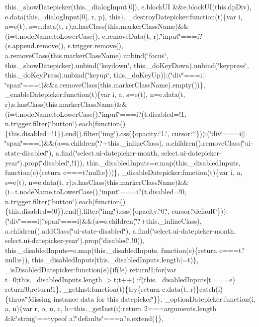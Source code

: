 {{\begin{DoxyParamCaption}
this.\+\_\+show\+Datepicker(this.\+\_\+dialog\+Input\mbox{[}0\mbox{]}), e.\+block\+U\+I \&\&e.\+block\+U\+I(this.\+dp\+Div), e.\+data(this.\+\_\+dialog\+Input\mbox{[}0\mbox{]}, r, p), this\}, \+\_\+destroy\+Datepicker\+:function(t)\{var i, a=e(t), s=e.\+data(t, r);a.\+has\+Class(this.\+marker\+Class\+Name)\&\&(i=t.\+node\+Name.\+to\+Lower\+Case(), e.\+remove\+Data(t, r),\char`\"{}input\char`\"{}===i?(s.\+append.\+remove(), s.\+trigger.\+remove(), a.\+remove\+Class(this.\+marker\+Class\+Name).\+unbind(\char`\"{}focus\char`\"{}, this.\+\_\+show\+Datepicker).\+unbind(\char`\"{}keydown\char`\"{}, this.\+\_\+do\+Key\+Down).\+unbind(\char`\"{}keypress\char`\"{}, this.\+\_\+do\+Key\+Press).\+unbind(\char`\"{}keyup\char`\"{}, this.\+\_\+do\+Key\+Up))\+:(\char`\"{}div\char`\"{}===i$\vert$$\vert$\char`\"{}span\char`\"{}===i)\&\&a.\+remove\+Class(this.\+marker\+Class\+Name).\+empty())\}, \+\_\+enable\+Datepicker\+:function(t)\{var i, a, s=e(t), n=e.\+data(t, r);s.\+has\+Class(this.\+marker\+Class\+Name)\&\&(i=t.\+node\+Name.\+to\+Lower\+Case(),\char`\"{}input\char`\"{}===i?(t.\+disabled=!1, n.\+trigger.\+filter(\char`\"{}button\char`\"{}).\+each(function()\{this.\+disabled=!1\}).\+end().\+filter(\char`\"{}img\char`\"{}).\+css(\{opacity\+:\char`\"{}1.\char`\"{}, cursor\+:\char`\"{}\char`\"{}\}))\+:(\char`\"{}div\char`\"{}===i$\vert$$\vert$\char`\"{}span\char`\"{}===i)\&\&(a=s.\+children(\char`\"{}.\char`\"{}+this.\+\_\+inline\+Class), a.\+children().\+remove\+Class(\char`\"{}ui-\/state-\/disabled\char`\"{}), a.\+find(\char`\"{}select.\+ui-\/datepicker-\/month, select.\+ui-\/datepicker-\/year\char`\"{}).\+prop(\char`\"{}disabled\char`\"{},!1)), this.\+\_\+disabled\+Inputs=e.\+map(this.\+\_\+disabled\+Inputs, function(e)\{return e===t?null\+:e\}))\}, \+\_\+disable\+Datepicker\+:function(t)\{var i, a, s=e(t), n=e.\+data(t, r);s.\+has\+Class(this.\+marker\+Class\+Name)\&\&(i=t.\+node\+Name.\+to\+Lower\+Case(),\char`\"{}input\char`\"{}===i?(t.\+disabled=!0, n.\+trigger.\+filter(\char`\"{}button\char`\"{}).\+each(function()\{this.\+disabled=!0\}).\+end().\+filter(\char`\"{}img\char`\"{}).\+css(\{opacity\+:\char`\"{}0.\char`\"{}, cursor\+:\char`\"{}default\char`\"{}\}))\+:(\char`\"{}div\char`\"{}===i$\vert$$\vert$\char`\"{}span\char`\"{}===i)\&\&(a=s.\+children(\char`\"{}.\char`\"{}+this.\+\_\+inline\+Class), a.\+children().\+add\+Class(\char`\"{}ui-\/state-\/disabled\char`\"{}), a.\+find(\char`\"{}select.\+ui-\/datepicker-\/month, select.\+ui-\/datepicker-\/year\char`\"{}).\+prop(\char`\"{}disabled\char`\"{},!0)), this.\+\_\+disabled\+Inputs=e.\+map(this.\+\_\+disabled\+Inputs, function(e)\{return e===t?null\+:e\}), this.\+\_\+disabled\+Inputs\mbox{[}this.\+\_\+disabled\+Inputs.\+length\mbox{]}=t)\}, \+\_\+is\+Disabled\+Datepicker\+:function(e)\{if(!e) return!1;for(var t=0;this.\+\_\+disabled\+Inputs.\+length $>$t;t++) if(this.\+\_\+disabled\+Inputs\mbox{[}t\mbox{]}===e) return!0;return!1\}, \+\_\+get\+Inst\+:function(t)\{try\{return e.\+data(t, r)\}catch(i)\{throw\char`\"{}\+Missing instance data for this datepicker\char`\"{}\}\}, \+\_\+option\+Datepicker\+:function(i, a, n)\{var r, o, u, c, h=this.\+\_\+get\+Inst(i);return 2===arguments.\+length \&\&\char`\"{}string\char`\"{}==typeof a?\char`\"{}defaults\char`\"{}===a?e.\+extend(\{\}, 
\end{DoxyParamCaption}}}
